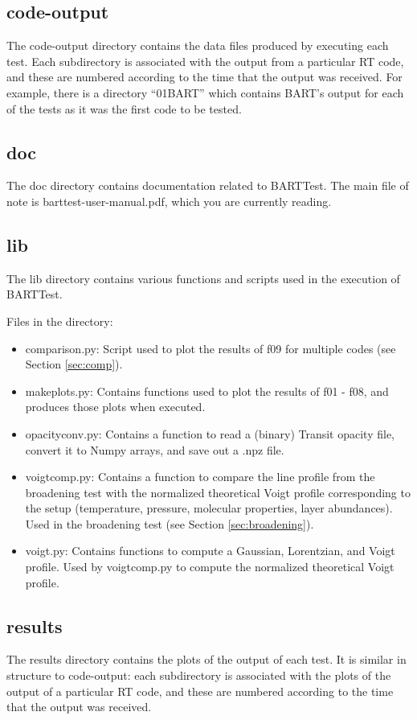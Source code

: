 \documentclass[letterpaper, 12pt]{article}
\begin{document}
\subsection{code-output}
\label{sec:output}
The code-output directory contains the data files produced by executing 
each test. Each subdirectory is associated with the output from a particular 
RT code, and these are numbered according to the time that the output was 
received. For example, there is a directory ``01BART'' which contains BART's 
output for each of the tests as it was the first code to be tested.

\subsection{doc}
The doc directory contains documentation related to BARTTest. The main file 
of note is barttest-user-manual.pdf, which you are currently reading.

\subsection{lib}
The lib directory contains various functions and scripts used in the execution 
of BARTTest.

Files in the directory:
\begin{itemize} \itemsep0pt
  \item comparison.py: Script used to plot the results of f09 for multiple 
        codes (see Section \ref{sec:comp}).
  \item makeplots.py: Contains functions used to plot the results of f01 - f08, 
        and produces those plots when executed.
  \item opacityconv.py: Contains a function to read a (binary) Transit opacity 
        file, convert it to Numpy arrays, and save out a .npz file.
  \item voigtcomp.py: Contains a function to compare the line profile from the 
        broadening test with the normalized theoretical Voigt profile 
        corresponding to the setup (temperature, pressure, molecular 
        properties, layer abundances). Used in the broadening test (see 
        Section \ref{sec:broadening}).
  \item voigt.py: Contains functions to compute a Gaussian, Lorentzian, and 
        Voigt profile. Used by voigtcomp.py to compute the normalized 
        theoretical Voigt profile.
\end{itemize}

\subsection{results}
\label{sec:results}
The results directory contains the plots of the output of each test. It is 
similar in structure to code-output: each subdirectory is associated with 
the plots of the output of a particular RT code, and these are numbered 
according to the time that the output was received. 
\end{document}
